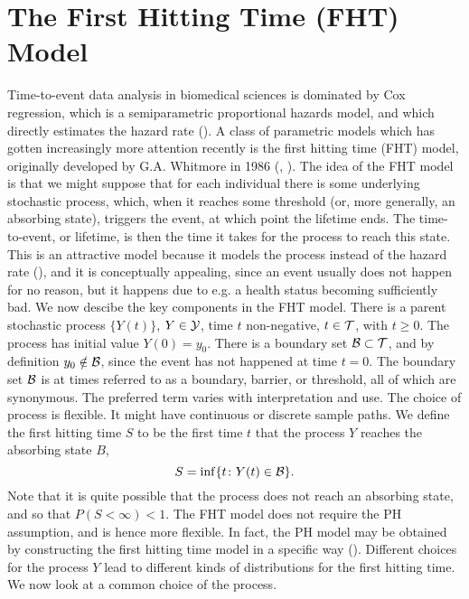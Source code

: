 \section{The First Hitting Time (FHT) Model}\label{sec:fht}
Time-to-event data analysis in biomedical sciences is dominated by Cox regression, which is a semiparametric proportional hazards model, and which directly estimates the hazard rate (\cite{stogiannis-2013}). A class of parametric models which has gotten increasingly more attention recently is the first hitting time (FHT) model, originally developed by G.A. Whitmore in 1986 (\cite{whitmore1986}, \cite{leewhitmore2006}). The idea of the FHT model is that we might suppose that for each individual there is some underlying stochastic process, which, when it reaches some threshold (or, more generally, an absorbing state), triggers the event, at which point the lifetime ends. The time-to-event, or lifetime, is then the time it takes for the process to reach this state. This is an attractive model because it models the process instead of the hazard rate (\cite{aalengjessing2001}), and it is conceptually appealing, since an event usually does not happen for no reason, but it happens due to e.g. a health status becoming sufficiently bad. We now descibe the key components in the FHT model. There is a parent stochastic process $\{Y(t)\}$, $Y\in\mathcal{Y}$, time $t$ non-negative, $t\in\mathcal{T}$, with $t\geq0$. The process has initial value $Y(0)=y_0$. There is a boundary set $\mathcal{B}\subset\mathcal{T}$, and by definition $y_0\notin\mathcal{B}$, since the event has not happened at time $t=0$. The boundary set $\mathcal{B}$ is at times referred to as a boundary, barrier, or threshold, all of which are synonymous. The preferred term varies with interpretation and use.
The choice of process is flexible. It might have continuous or discrete sample paths. We define the first hitting time $S$ to be the first time $t$ that the process $Y$ reaches the absorbing state $B$,
\begin{equation}
    S=\inf\{t\colon Y(t)\in\mathcal{B}\}.
\end{equation}
Note that it is quite possible that the process does not reach an absorbing state, and so that $P(S<\infty)<1$. The FHT model does not require the PH assumption, and is hence more flexible. In fact, the PH model may be obtained by constructing the first hitting time model in a specific way (\cite{lee2010}). Different choices for the process $Y$ lead to different kinds of distributions for the first hitting time. We now look at a common choice of the process.

